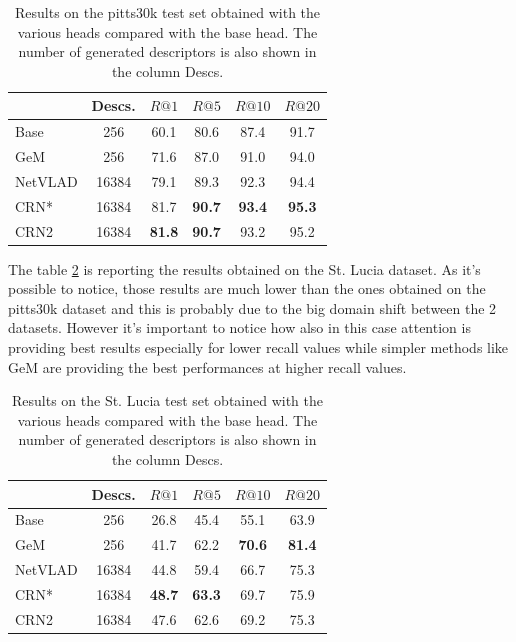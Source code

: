 \documentclass[10pt,twocolumn,letterpaper]{article}
\begin{document}
\begin{table}
	\centering
	\begin{tabular}{|l|c|c|c|c|c|}
		\hline
		& Descs.&        $R@1$   &        $R@5$   &        $R@10$  &        $R@20$   \\ \hline
		Base     & 256   &         60.1   &         80.6   &          87.4   &          91.7   \\
		GeM      & 256   &         71.6   &         87.0   &          91.0   &          94.0   \\
		NetVLAD  & 16384 &         79.1   &         89.3   &          92.3   &          94.4   \\ \hline
		CRN*     & 16384 &         81.7   & \textbf{90.7}  &  \textbf{93.4}  &  \textbf{95.3}  \\
		CRN2     & 16384 &\textbf{81.8}   & \textbf{90.7}  &          93.2   &          95.2   \\ \hline
	\end{tabular}
	\caption{Results on the pitts30k test set obtained with the various heads compared with the base head. The number of generated descriptors 
		is also shown in the column Descs.}
	\label{tab:base_results}
\end{table}

The table \ref{tab:base_results:st_lucia} is reporting the results obtained on the St. Lucia dataset. As it's possible to notice, 
those results are much lower than the ones obtained on the pitts30k dataset and this is probably due to the big domain shift between the 2 datasets.
However it's important to notice how also in this case attention is providing best results especially for lower recall values while
simpler methods like GeM are providing the best performances at higher recall values. 
\begin{table}
	\centering
	\begin{tabular}{|l|c|c|c|c|c|}
		\hline
		& Descs.&        $R@1$   &        $R@5$   &        $R@10$  &        $R@20$   \\ \hline
		Base     & 256   &         26.8   &         45.4   &          55.1   &          63.9   \\
		GeM      & 256   &         41.7   &         62.2   &  \textbf{70.6}  &  \textbf{81.4}   \\
		NetVLAD  & 16384 &         44.8   &         59.4   &          66.7   &          75.3   \\ \hline
		CRN*     & 16384 & \textbf{48.7}  & \textbf{63.3}  &          69.7   &          75.9  \\
		CRN2     & 16384 &         47.6   &         62.6   &          69.2   &          75.3   \\ \hline
	\end{tabular}
	\caption{Results on the St. Lucia test set obtained with the various heads compared with the base head. The number of generated descriptors 
		is also shown in the column Descs.}
	\label{tab:base_results:st_lucia}
\end{table}
\end{document}
